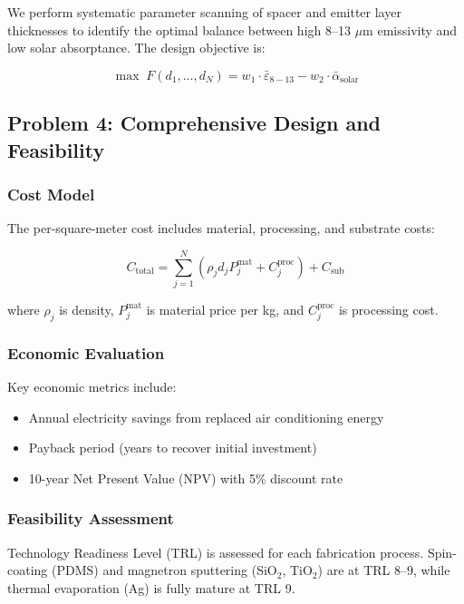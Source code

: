We perform systematic parameter scanning of spacer and emitter layer thicknesses to identify the optimal balance between high 8--13 $\mu$m emissivity and low solar absorptance. The design objective is:

\begin{equation}
  \max \; F(d_1, \ldots, d_N) = w_1 \cdot \bar{\varepsilon}_{8-13} - w_2 \cdot \bar{\alpha}_{\text{solar}}
  \label{eq:fitness}
\end{equation}

\subsection{Problem 4: Comprehensive Design and Feasibility}

\subsubsection{Cost Model}

The per-square-meter cost includes material, processing, and substrate costs:

\begin{equation}
  C_{\text{total}} = \sum_{j=1}^{N} \left(\rho_j d_j P_j^{\text{mat}} + C_j^{\text{proc}}\right) + C_{\text{sub}}
  \label{eq:cost}
\end{equation}

where $\rho_j$ is density, $P_j^{\text{mat}}$ is material price per kg, and $C_j^{\text{proc}}$ is processing cost.

\subsubsection{Economic Evaluation}

Key economic metrics include:
\begin{itemize}
  \item Annual electricity savings from replaced air conditioning energy
  \item Payback period (years to recover initial investment)
  \item 10-year Net Present Value (NPV) with 5\% discount rate
\end{itemize}

\subsubsection{Feasibility Assessment}

Technology Readiness Level (TRL) is assessed for each fabrication process. Spin-coating (PDMS) and magnetron sputtering (SiO$_2$, TiO$_2$) are at TRL 8--9, while thermal evaporation (Ag) is fully mature at TRL 9.
